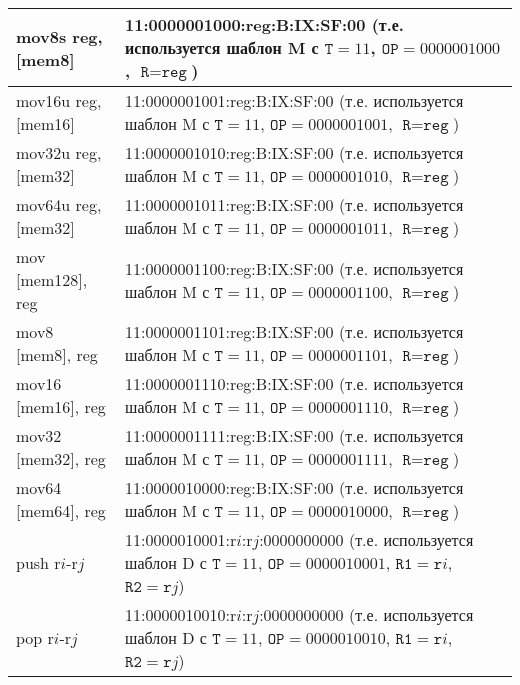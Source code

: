 \documentclass[10pt]{report}
\begin{document}
\begin{longtable}[c]{|l|p{12.5cm}|}
mov8s reg, [mem8]    & 11:0000001000:reg:B:IX:SF:00 (т.е. используется шаблон M с $\texttt{T}=11$, $\texttt{OP}=0000001000$, $\texttt{R}=\texttt{reg}$)\\ \hline
mov16u reg, [mem16]  & 11:0000001001:reg:B:IX:SF:00 (т.е. используется шаблон M с $\texttt{T}=11$, $\texttt{OP}=0000001001$, $\texttt{R}=\texttt{reg}$)\\ \hline
mov32u reg, [mem32]  & 11:0000001010:reg:B:IX:SF:00 (т.е. используется шаблон M с $\texttt{T}=11$, $\texttt{OP}=0000001010$, $\texttt{R}=\texttt{reg}$)\\ \hline
mov64u reg, [mem32]  & 11:0000001011:reg:B:IX:SF:00 (т.е. используется шаблон M с $\texttt{T}=11$, $\texttt{OP}=0000001011$, $\texttt{R}=\texttt{reg}$)\\ \hline
mov [mem128], reg    & 11:0000001100:reg:B:IX:SF:00 (т.е. используется шаблон M с $\texttt{T}=11$, $\texttt{OP}=0000001100$, $\texttt{R}=\texttt{reg}$)\\ \hline
mov8 [mem8], reg     & 11:0000001101:reg:B:IX:SF:00 (т.е. используется шаблон M с $\texttt{T}=11$, $\texttt{OP}=0000001101$, $\texttt{R}=\texttt{reg}$)\\ \hline
mov16 [mem16], reg   & 11:0000001110:reg:B:IX:SF:00 (т.е. используется шаблон M с $\texttt{T}=11$, $\texttt{OP}=0000001110$, $\texttt{R}=\texttt{reg}$)\\ \hline
mov32 [mem32], reg   & 11:0000001111:reg:B:IX:SF:00 (т.е. используется шаблон M с $\texttt{T}=11$, $\texttt{OP}=0000001111$, $\texttt{R}=\texttt{reg}$)\\ \hline
mov64 [mem64], reg   & 11:0000010000:reg:B:IX:SF:00 (т.е. используется шаблон M с $\texttt{T}=11$, $\texttt{OP}=0000010000$, $\texttt{R}=\texttt{reg}$)\\ \hline
push r$i$-r$j$       & 11:0000010001:r$i$:r$j$:0000000000 (т.е. используется шаблон D с $\texttt{T}=11$, $\texttt{OP}=0000010001$, $\texttt{R1}=\texttt{r}i$, $\texttt{R2}=\texttt{r}j$) \\ \hline
pop r$i$-r$j$        & 11:0000010010:r$i$:r$j$:0000000000 (т.е. используется шаблон D с $\texttt{T}=11$, $\texttt{OP}=0000010010$, $\texttt{R1}=\texttt{r}i$, $\texttt{R2}=\texttt{r}j$) \\ \hline
\end{longtable}
    
\end{document}
